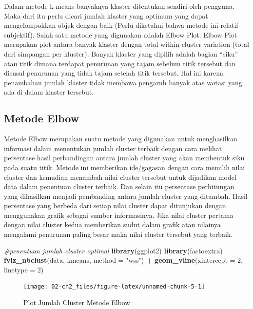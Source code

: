 \documentclass[
  oneside]{book}
\newenvironment{Shaded}{\begin{snugshade}}{\end{snugshade}}
\newcommand{\AttributeTok}[1]{\textcolor[rgb]{0.13,0.29,0.53}{#1}}
\newcommand{\CommentTok}[1]{\textcolor[rgb]{0.56,0.35,0.01}{\textit{#1}}}
\newcommand{\DecValTok}[1]{\textcolor[rgb]{0.00,0.00,0.81}{#1}}
\newcommand{\FunctionTok}[1]{\textcolor[rgb]{0.13,0.29,0.53}{\textbf{#1}}}
\newcommand{\NormalTok}[1]{#1}
\newcommand{\SpecialCharTok}[1]{\textcolor[rgb]{0.81,0.36,0.00}{\textbf{#1}}}
\newcommand{\StringTok}[1]{\textcolor[rgb]{0.31,0.60,0.02}{#1}}
\begin{document}
Dalam metode k-means banyaknya klaster ditentukan sendiri oleh pengguna. Maka dari itu perlu dicari jumlah klaster yang optimum yang dapat mengelompokkan objek dengan baik (Perlu diketahui bahwa metode ini relatif subjektif). Salah satu metode yang digunakan adalah Elbow Plot. Elbow Plot merupakan plot antara banyak klaster dengan total within-cluster variation (total dari simpangan per kluster). Banyak klaster yang dipilih adalah bagian ``siku'' atau titik dimana terdapat penurunan yang tajam sebelum titik tersebut dan disusul penurunan yang tidak tajam setelah titik tersebut. Hal ini karena penambahan jumlah klaster tidak membawa pengaruh banyak atas variasi yang ada di dalam klaster tersebut.

\subsection*{Metode Elbow}\label{metode-elbow}

Metode Elbow merupakan suatu metode yang digunakan untuk menghasilkan informasi dalam menentukan jumlah cluster terbaik dengan cara melihat persentase hasil perbandingan antara jumlah cluster yang akan membentuk siku pada suatu titik. Metode ini memberikan ide/gagasan dengan cara memilih nilai cluster dan kemudian menambah nilai cluster tersebut untuk dijadikan model data dalam penentuan cluster terbaik. Dan selain itu persentase perhitungan yang dihasilkan menjadi pembanding antara jumlah cluster yang ditambah. Hasil persentase yang berbeda dari setiap nilai cluster dapat ditunjukan dengan menggunakan grafik sebagai sumber informasinya. Jika nilai cluster pertama dengan nilai cluster kedua memberikan sudut dalam grafik atau nilainya mengalami penurunan paling besar maka nilai cluster tersebut yang terbaik.

\begin{Shaded}
\begin{Highlighting}[]
\CommentTok{\#penentuan jumlah cluster optimal}
\FunctionTok{library}\NormalTok{(ggplot2)}
\FunctionTok{library}\NormalTok{(factoextra)}
\FunctionTok{fviz\_nbclust}\NormalTok{(data, kmeans, }\AttributeTok{method =} \StringTok{"wss"}\NormalTok{) }\SpecialCharTok{+}
  \FunctionTok{geom\_vline}\NormalTok{(}\AttributeTok{xintercept =} \DecValTok{2}\NormalTok{, }\AttributeTok{linetype =} \DecValTok{2}\NormalTok{)}
\end{Highlighting}
\end{Shaded}

\begin{figure}[h]

{\centering \texttt{[image: 02-ch2\_files/figure-latex/unnamed-chunk-5-1]} 

}

\caption{Plot Jumlah Cluster Metode Elbow}\label{fig:unnamed-chunk-5}
\end{figure}
\end{document}

